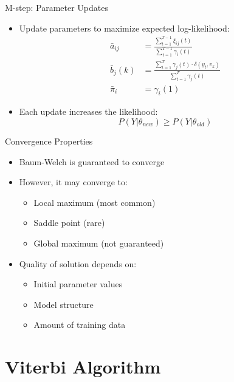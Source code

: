 \documentclass{beamer}
\begin{document}
\begin{frame}{M-step: Parameter Updates}
    \begin{itemize}
        \item Update parameters to maximize expected log-likelihood:
        \begin{align*}
            \bar{a}_{ij} &= \frac{\sum_{t=1}^{T-1} \xi_{ij}(t)}{\sum_{t=1}^{T-1} \gamma_i(t)} \\
            \bar{b}_j(k) &= \frac{\sum_{t=1}^{T} \gamma_j(t) \cdot \delta(y_t, v_k)}{\sum_{t=1}^{T} \gamma_j(t)} \\
            \bar{\pi}_i &= \gamma_i(1)
        \end{align*}
        \item Each update increases the likelihood:
        \[P(Y|\theta_{new}) \geq P(Y|\theta_{old})\]
    \end{itemize}
\end{frame}

\begin{frame}{Convergence Properties}
    \begin{itemize}
        \item Baum-Welch is guaranteed to converge
        \item However, it may converge to:
        \begin{itemize}
            \item Local maximum (most common)
            \item Saddle point (rare)
            \item Global maximum (not guaranteed)
        \end{itemize}
        \item Quality of solution depends on:
        \begin{itemize}
            \item Initial parameter values
            \item Model structure
            \item Amount of training data
        \end{itemize}
    \end{itemize}
\end{frame}
\section{Viterbi Algorithm}
\end{document}
